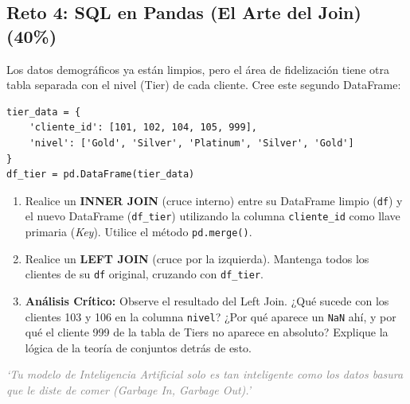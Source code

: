 \documentclass[12pt,a4paper]{article}
\begin{document}
\subsection*{Reto 4: SQL en Pandas (El Arte del Join) (40\%)}
Los datos demográficos ya están limpios, pero el área de fidelización tiene otra tabla separada con el nivel (Tier) de cada cliente.
Cree este segundo DataFrame:
\begin{verbatim}
tier_data = {
    'cliente_id': [101, 102, 104, 105, 999],
    'nivel': ['Gold', 'Silver', 'Platinum', 'Silver', 'Gold']
}
df_tier = pd.DataFrame(tier_data)
\end{verbatim}

\begin{enumerate}
    \item Realice un \textbf{INNER JOIN} (cruce interno) entre su DataFrame limpio (\texttt{df}) y el nuevo DataFrame (\texttt{df\_tier}) utilizando la columna \texttt{cliente\_id} como llave primaria (\textit{Key}). Utilice el método \texttt{pd.merge()}.
    \item Realice un \textbf{LEFT JOIN} (cruce por la izquierda). Mantenga todos los clientes de su \texttt{df} original, cruzando con \texttt{df\_tier}. 
    \item \textbf{Análisis Crítico:} Observe el resultado del Left Join. ¿Qué sucede con los clientes 103 y 106 en la columna \texttt{nivel}? ¿Por qué aparece un \texttt{NaN} ahí, y por qué el cliente 999 de la tabla de Tiers no aparece en absoluto? Explique la lógica de la teoría de conjuntos detrás de esto.
\end{enumerate}

\vspace{1cm}
\begin{center}
    \textit{\textcolor{gray}{`Tu modelo de Inteligencia Artificial solo es tan inteligente como los datos basura que le diste de comer (Garbage In, Garbage Out).'}}
\end{center}
\end{document}
